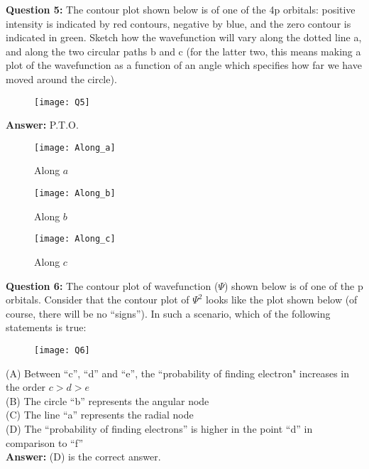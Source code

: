 \documentclass[12pt]{article}
\begin{document}
	\textbf{Question 5: }The contour plot shown below is of one of the 4p orbitals: positive intensity is indicated 
	by red contours, negative by blue, and the zero contour is indicated in green.
	Sketch how the wavefunction will vary along the dotted line a, and along the two 
	circular paths b and c (for the latter two, this means making a plot of the wavefunction 
	as a function of an angle which specifies how far we have moved around the circle).
	
	\begin{figure}[H]
		\centering
		\texttt{[image: Q5]}
	\end{figure}

	\textbf{Answer: }P.T.O.\\
	
	\begin{figure}[H]
		\centering
		\texttt{[image: Along\_a]}
		\caption{Along $a$}
	\end{figure}

	\begin{figure}[H]
		\centering
		\texttt{[image: Along\_b]}
		\caption{Along $b$}
	\end{figure}

	\begin{figure}[H]
		\centering
		\texttt{[image: Along\_c]}
		\caption{Along $c$}
	\end{figure}

	\textbf{Question 6: } The contour plot of wavefunction ($\Psi$) shown below is of one of the p orbitals. Consider that 
	the contour plot of $\Psi^{2}$ looks like the plot shown below (of course, there will be no “signs”). In 
	such a scenario, which of the following statements is true:\\
	
	\begin{figure}[H]
		\centering
		\texttt{[image: Q6]}
	\end{figure}

	(A) Between “c”, “d” and “e”, the ``probability of finding electron" increases in the order 
	$c>d>e$\\
	(B) The circle “b” represents the angular node\\
	(C) The line “a” represents the radial node\\
	(D) The “probability of finding electrons” is higher in the point “d” in comparison to “f”\\
	
	\textbf{Answer: }(D) is  the correct answer.
\end{document}
